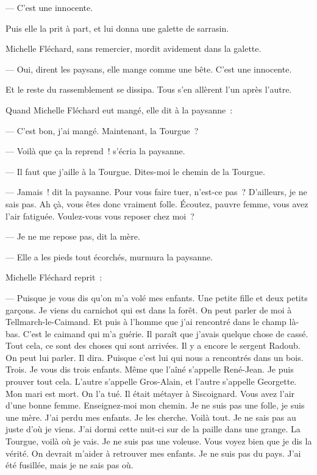 \documentclass[french,twoside]{book} %
\begin{document}
— C’est une innocente.\par
 Puis elle la prit à part, et lui donna une galette de sarrasin.\par
Michelle Fléchard, sans remercier, mordit avidement dans la galette.\par
— Oui, dirent les paysans, elle mange comme une bête. C’est une innocente.\par
Et le reste du rassemblement se dissipa. Tous s’en allèrent l’un après l’autre.\par
Quand Michelle Fléchard eut mangé, elle dit à la paysanne :\par
— C’est bon, j’ai mangé. Maintenant, la Tourgue ?\par
— Voilà que ça la reprend ! s’écria la paysanne.\par
— Il faut que j’aille à la Tourgue. Dites-moi le chemin de la Tourgue.\par
— Jamais ! dit la paysanne. Pour vous faire tuer, n’est-ce pas ? D’ailleurs, je ne sais pas. Ah çà, vous êtes donc vraiment folle. Écoutez, pauvre femme, vous avez l’air fatiguée. Voulez-vous vous reposer chez moi ?\par
— Je ne me repose pas, dit la mère.\par
— Elle a les pieds tout écorchés, murmura la paysanne.\par
Michelle Fléchard reprit :\par
— Puisque je vous dis qu’on m’a volé mes enfants. Une petite fille et deux petits garçons. Je viens du carnichot qui est dans la forêt. On peut parler de moi à Tellmarch-le-Caimand. Et puis à l’homme que j’ai rencontré dans le champ là-bas. C’est le caimand qui m’a guérie. Il paraît que j’avais quelque chose de cassé. Tout cela, ce sont des choses qui sont arrivées. Il y a encore le sergent Radoub. On peut lui parler. Il dira.  Puisque c’est lui qui nous a rencontrés dans un bois. Trois. Je vous dis trois enfants. Même que l’aîné s’appelle René-Jean. Je puis prouver tout cela. L’autre s’appelle Gros-Alain, et l’autre s’appelle Georgette. Mon mari est mort. On l’a tué. Il était métayer à Siscoignard. Vous avez l’air d’une bonne femme. Enseignez-moi mon chemin. Je ne suis pas une folle, je suis une mère. J’ai perdu mes enfants. Je les cherche. Voilà tout. Je ne sais pas au juste d’où je viens. J’ai dormi cette nuit-ci sur de la paille dans une grange. La Tourgue, voilà où je vais. Je ne suis pas une voleuse. Vous voyez bien que je dis la vérité. On devrait m’aider à retrouver mes enfants. Je ne suis pas du pays. J’ai été fusillée, mais je ne sais pas où.\par
\end{document}
